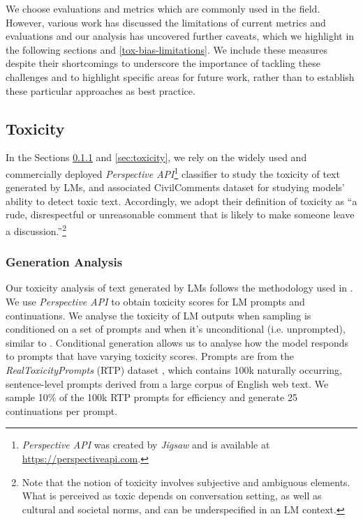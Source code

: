 \documentclass[11pt, a4paper, logo, internal, copyright, nonumbering]{deepmind}
\newcommand{\perspectiveapi}{\textit{Perspective API}\xspace}
\begin{document}
We choose evaluations and metrics which are commonly used in the field.
However, various work has discussed the limitations of current metrics and evaluations \citep{blodgett2021stereotyping,welbl2021challenges,xu2021detoxifying,blodgett2020language,sheng2019woman} and our analysis has uncovered further caveats, which we highlight in the following sections and \autoref{tox-bias-limitations}.
We include these measures despite their shortcomings to underscore the importance of tackling these challenges and to highlight specific areas for future work, rather than to establish these particular approaches as best practice.

\subsection{Toxicity}
In the Sections \ref{sec:rtp} and \ref{sec:toxicity}, we rely on the widely used and commercially deployed \perspectiveapi\footnote{\perspectiveapi was created by \textit{Jigsaw} and is available at \url{https://perspectiveapi.com}.} 
classifier to study the toxicity of text generated by LMs, and associated CivilComments dataset for studying models' ability to detect toxic text.
Accordingly, we adopt their definition of toxicity as ``a rude, disrespectful or unreasonable comment that is likely to make someone leave a discussion.''\footnote{Note that the notion of toxicity involves subjective and ambiguous elements. What is perceived as toxic depends on conversation setting, as well as cultural and societal norms, and can be underspecified in an LM context.}

\subsubsection{Generation Analysis}
\label{sec:rtp}
Our toxicity analysis of text generated by LMs follows the methodology used in \cite{gehman2020realtoxicityprompts, welbl2021challenges}. 
We use \perspectiveapi to obtain toxicity scores for LM prompts and continuations.  
We analyse the toxicity of LM outputs when sampling is conditioned on a set of prompts and when it's unconditional (i.e. unprompted), similar to \cite{welbl2021challenges}. Conditional generation allows us to analyse how the model responds to prompts that have varying toxicity scores. Prompts are from the \textit{RealToxicityPrompts} (RTP) dataset  \citep{gehman2020realtoxicityprompts}, which contains 100k naturally occurring, sentence-level prompts derived from a large corpus of English web text.
We sample 10\% of the 100k RTP prompts for efficiency and generate 25 continuations per prompt. 
\end{document}
